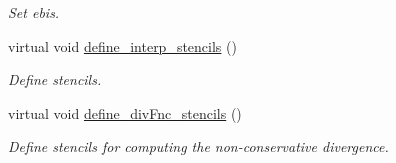 \begin{DoxyCompactItemize}
\begin{DoxyCompactList}\small\item\em Set ebis. \end{DoxyCompactList}\item 
virtual void \hyperlink{classcdr__solver_ab8d9cb4b14e593b5287a1217ed6898d0}{define\+\_\+interp\+\_\+stencils} ()
\begin{DoxyCompactList}\small\item\em Define stencils. \end{DoxyCompactList}\item 
virtual void \hyperlink{classcdr__solver_ab6a6f6c11e9de8d96829b606fc2ac22f}{define\+\_\+div\+Fnc\+\_\+stencils} ()
\begin{DoxyCompactList}\small\item\em Define stencils for computing the non-\/conservative divergence. \end{DoxyCompactList}\end{DoxyCompactItemize}
